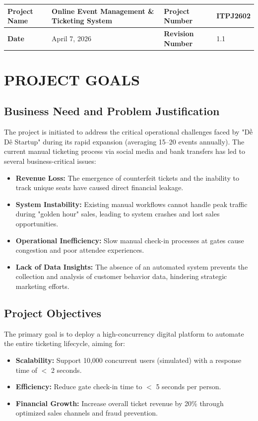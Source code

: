 
\noindent
\begin{tabularx}{\textwidth}{|l|Y|l|Y|}
\hline
\textbf{Project Name} & Online Event Management \& Ticketing System & \textbf{Project Number} & ITPJ2602 \\ \hline
\textbf{Date} & April 7, 2026 & \textbf{Revision Number} & 1.1 \\ \hline
\end{tabularx}

\vspace{2cm}

\chapter{PROJECT GOALS}

\section{Business Need and Problem Justification}
The project is initiated to address the critical operational challenges faced by "Dề Dê Startup" during its rapid expansion (averaging 15–20 events annually). The current manual ticketing process via social media and bank transfers has led to several business-critical issues:
\begin{itemize}
    \item \textbf{Revenue Loss:} The emergence of counterfeit tickets and the inability to track unique seats have caused direct financial leakage.
    \item \textbf{System Instability:} Existing manual workflows cannot handle peak traffic during "golden hour" sales, leading to system crashes and lost sales opportunities.
    \item \textbf{Operational Inefficiency:} Slow manual check-in processes at gates cause congestion and poor attendee experiences.
    \item \textbf{Lack of Data Insights:} The absence of an automated system prevents the collection and analysis of customer behavior data, hindering strategic marketing efforts.
\end{itemize}

\section{Project Objectives}
The primary goal is to deploy a high-concurrency digital platform to automate the entire ticketing lifecycle, aiming for:
\begin{itemize}
    \item \textbf{Scalability:} Support 10,000 concurrent users (simulated) with a response time of $<$ 2 seconds.
    \item \textbf{Efficiency:} Reduce gate check-in time to $<$ 5 seconds per person.
    \item \textbf{Financial Growth:} Increase overall ticket revenue by 20\% through optimized sales channels and fraud prevention.
\end{itemize}

